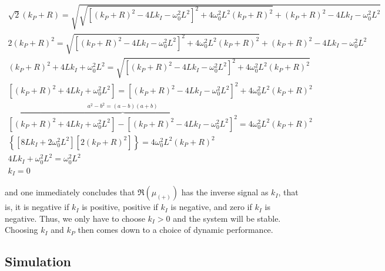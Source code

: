 \begin{gather}
	\sqrt{2}\left(k_P + R\right) = \sqrt{\sqrt{\left[\left(k_P + R\right)^2 - 4Lk_I - \omega_0^2L^2\right]^2 + 4\omega_0^2 L^2 \left(k_P + R\right)^2} + \left(k_P + R\right)^2 - 4Lk_I - \omega_0^2L^2} \nonumber\\[5mm]
%
	2\left(k_P + R\right)^2 = \sqrt{\left[\left(k_P + R\right)^2 - 4Lk_I - \omega_0^2L^2\right]^2 + 4\omega_0^2 L^2 \left(k_P + R\right)^2} + \left(k_P + R\right)^2 - 4Lk_I - \omega_0^2L^2 \nonumber\\[5mm]
%
	\left(k_P + R\right)^2 + 4Lk_I + \omega_0^2L^2 = \sqrt{\left[\left(k_P + R\right)^2 - 4Lk_I - \omega_0^2L^2\right]^2 + 4\omega_0^2 L^2 \left(k_P + R\right)^2} \nonumber\\[5mm]
%
	\left[\left(k_P + R\right)^2 + 4Lk_I + \omega_0^2L^2\right] = \left[\left(k_P + R\right)^2 - 4Lk_I - \omega_0^2L^2\right]^2 + 4\omega_0^2 L^2 \left(k_P + R\right)^2 \nonumber\\[5mm]
%
	\overbrace{\left[\left(k_P + R\right)^2 + 4Lk_I + \omega_0^2L^2\right] - \left[\left(k_P + R\right)^2 - 4Lk_I - \omega_0^2L^2\right]^2}^{a^2 - b^2 = (a-b)(a+b)} = 4\omega_0^2 L^2 \left(k_P + R\right)^2 \nonumber\\[5mm]
%
%
	\left\{\left[8Lk_I + 2\omega_0^2L^2\right]\left[2\left(k_P + R\right)^2\right]\right\} = 4\omega_0^2 L^2 \left(k_P + R\right)^2 \nonumber\\[5mm]
%
	4Lk_I + \omega_0^2L^2 = \omega_0^2 L^2 \nonumber\\[5mm]
%
	k_I = 0
\end{gather}

	\noindent and one immediately concludes that $\Re\left(\mu_{(+)}\right)$ has the inverse signal as $k_I$, that is, it is negative if $k_I$ is positive, positive if $k_I$ is negative, and zero if $k_I$ is negative. Thus, we only have to choose $k_I > 0$ and the system will be stable. Choosing $k_I$ and $k_P$ then comes down to a choice of dynamic performance.

\subsection{Simulation}\label{subsec:newcontroller_sim} %

